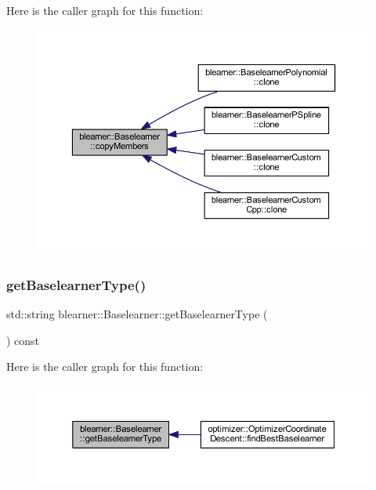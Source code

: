 Here is the caller graph for this function\+:\nopagebreak
\begin{figure}[H]
\begin{center}
\leavevmode
\includegraphics[width=350pt]{classblearner_1_1_baselearner_ae8f114ca7c497f03c80de5981c7f811d_icgraph}
\end{center}
\end{figure}
\mbox{\label{classblearner_1_1_baselearner_acec1a791f94eed39d2662c245e7f6b51}} 
\subsubsection{\texorpdfstring{get\+Baselearner\+Type()}{getBaselearnerType()}}
{\footnotesize\ttfamily std\+::string blearner\+::\+Baselearner\+::get\+Baselearner\+Type (\begin{DoxyParamCaption}{ }\end{DoxyParamCaption}) const}

Here is the caller graph for this function\+:\nopagebreak
\begin{figure}[H]
\begin{center}
\leavevmode
\includegraphics[width=350pt]{classblearner_1_1_baselearner_acec1a791f94eed39d2662c245e7f6b51_icgraph}
\end{center}
\end{figure}
\mbox{\label{classblearner_1_1_baselearner_a2393dc1e3cf90919ebbbd237fe303860}} 
